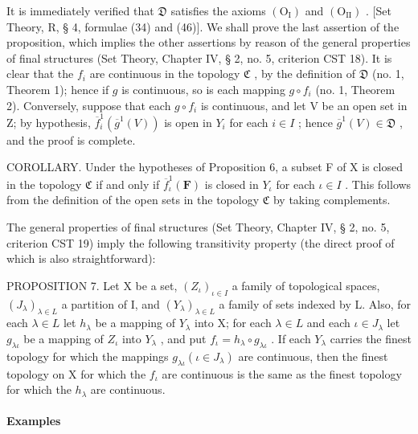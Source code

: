 It is immediately verified that \(\mathfrak{D}\) satisfies the axioms \((\mathrm{O_I})\) and \((\mathrm{O_{II}})\) . {[}Set Theory, R, § 4, formulae (34) and (46){]}. We shall prove the last assertion of the proposition, which implies the other assertions by reason of the general properties of final structures (Set Theory, Chapter IV, § 2, no. 5, criterion CST 18). It is clear that the \(f_{i}\) are continuous in the topology \(\mathfrak{C}\) , by the definition of \(\mathfrak{D}\) (no. 1, Theorem 1); hence if \(g\) is continuous, so is each mapping \(g \circ f_{i}\) (no. 1, Theorem 2). Conversely, suppose that each \(g \circ f_{i}\) is continuous, and let V be an open set in Z; by hypothesis, \(\overline{f}_{i}^{1}(\overline{g}^{1}(V))\) is open in \(Y_{i}\) for each \(i \in I\) ; hence \(\overline{g}^{1}(V) \in \mathfrak{D}\) , and the proof is complete.

COROLLARY. Under the hypotheses of Proposition 6, a subset F of X is closed in the topology \(\mathfrak{C}\) if and only if \(\overline{f}_{\iota}^{1}(\mathbf{F})\) is closed in \(Y_{\iota}\) for each \(\iota \in I\) . This follows from the definition of the open sets in the topology \(\mathfrak{C}\) by taking complements.

The general properties of final structures (Set Theory, Chapter IV, § 2, no. 5, criterion CST 19) imply the following transitivity property (the direct proof of which is also straightforward):

PROPOSITION 7. Let X be a set, \((Z_{\iota})_{\iota \in I}\) a family of topological spaces, \((J_{\lambda})_{\lambda \in L}\) a partition of I, and \((Y_{\lambda})_{\lambda \in L}\) a family of sets indexed by L. Also, for each \(\lambda \in L\) let \(h_{\lambda}\) be a mapping of \(Y_{\lambda}\) into X; for each \(\lambda \in L\) and each \(\iota \in J_{\lambda}\) let \(g_{\lambda \iota}\) be a mapping of \(Z_{\iota}\) into \(Y_{\lambda}\) , and put \(f_{\iota} = h_{\lambda} \circ g_{\lambda \iota}\) . If each \(Y_{\lambda}\) carries the finest topology for which the mappings \(g_{\lambda \iota} (\iota \in J_{\lambda})\) are continuous, then the finest topology on X for which the \(f_{\iota}\) are continuous is the same as the finest topology for which the \(h_{\lambda}\) are continuous.

\paragraph*{Examples}

